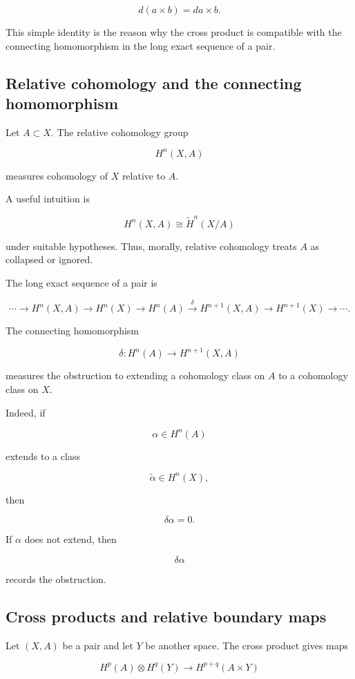 \documentclass[12pt,a4paper]{article}
\theoremstyle{notespace}
\begin{document}
\[
d(a\times b)=da\times b.
\]

This simple identity is the reason why the cross product is compatible with the connecting homomorphism in the long exact sequence of a pair.

\subsection{Relative cohomology and the connecting homomorphism}

Let \(A\subset X\). The relative cohomology group

\[
H^n(X,A)
\]

measures cohomology of \(X\) relative to \(A\).

A useful intuition is

\[
H^n(X,A)\cong \widetilde H^n(X/A)
\]

under suitable hypotheses. Thus, morally, relative cohomology treats \(A\) as collapsed or ignored.

The long exact sequence of a pair is

\[
\cdots
\longrightarrow
H^n(X,A)
\longrightarrow
H^n(X)
\longrightarrow
H^n(A)
\xrightarrow{\delta}
H^{n+1}(X,A)
\longrightarrow
H^{n+1}(X)
\longrightarrow
\cdots .
\]

The connecting homomorphism

\[
\delta:H^n(A)\to H^{n+1}(X,A)
\]

measures the obstruction to extending a cohomology class on \(A\) to a cohomology class on \(X\).

Indeed, if

\[
\alpha\in H^n(A)
\]

extends to a class

\[
\widetilde\alpha\in H^n(X),
\]

then

\[
\delta\alpha=0.
\]

If \(\alpha\) does not extend, then

\[
\delta\alpha
\]

records the obstruction.

\subsection{Cross products and relative boundary maps}

Let \((X,A)\) be a pair and let \(Y\) be another space. The cross product gives maps

\[
H^p(A)\otimes H^q(Y)
\longrightarrow
H^{p+q}(A\times Y)
\]
\end{document}
